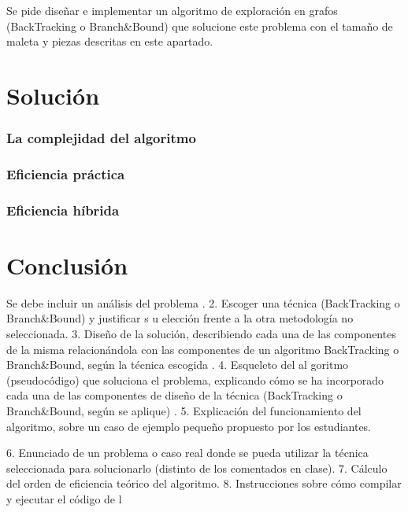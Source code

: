 \documentclass[a4paper, 11pt]{article}
\begin{document}
Se pide diseñar e implementar un algoritmo de exploración en grafos
(BackTracking o Branch\&Bound) que solucione este problema con el tamaño de maleta
y piezas descritas en este apartado.

\section{Solución}




\subsubsection{La complejidad del algoritmo}


\subsubsection{Eficiencia práctica}

\subsubsection{Eficiencia híbrida}

\section{Conclusión}





Se debe 
incluir un análisis del problema
.
2.
Escoger  una  técnica  (BackTracking  o  Branch\&Bound)  y  justificar  s
u  elección 
frente a la otra metodología no seleccionada.
3.
Diseño  de  la  solución,  describiendo  cada  una  de  las  componentes  de  la  misma 
relacionándola   con   las   componentes   de   un   algoritmo 
BackTracking   o 
Branch\&Bound, según la técnica escogida
.
4.
Esqueleto  del  al
goritmo  (pseudocódigo)  que  soluciona  el  problema,  explicando 
cómo  se  ha  incorporado  cada  una  de  las  componentes 
de  diseño  de  la  técnica 
(BackTracking o Branch\&Bound, según se aplique)
.
5.
Explicación   del   funcionamiento   del   algoritmo,   sobre   un   caso   de   ejemplo 
pequeño propuesto por los estudiantes.

 
6.
Enunciado  de  un  problema  o  caso  real  donde  se  pueda  utilizar 
la  técnica 
seleccionada
para solucionarlo (distinto de los comentados en clase).
7.
Cálculo del orden de eficiencia teórico del algoritmo.
8.
Instrucciones sobre 
cómo compilar y ejecutar el código de l
\end{document}
